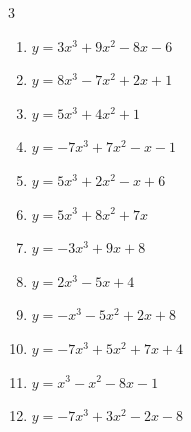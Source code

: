 \begin{multicols}{3}
\begin{enumerate}

  \item $y=3x^{3}+9x^{2}-8x-6$


  \item $y=8x^{3}-7x^{2}+2x+1$


  \item $y=5x^{3}+4x^{2}+1$


  \item $y=-7x^{3}+7x^{2}-x-1$


  \item $y=5x^{3}+2x^{2}-x+6$


  \item $y=5x^{3}+8x^{2}+7x$


  \item $y=-3x^{3}+9x+8$


  \item $y=2x^{3}-5x+4$


  \item $y=-x^{3}-5x^{2}+2x+8$


  \item $y=-7x^{3}+5x^{2}+7x+4$


  \item $y=x^{3}-x^{2}-8x-1$


  \item $y=-7x^{3}+3x^{2}-2x-8$



\end{enumerate}
\end{multicols}
